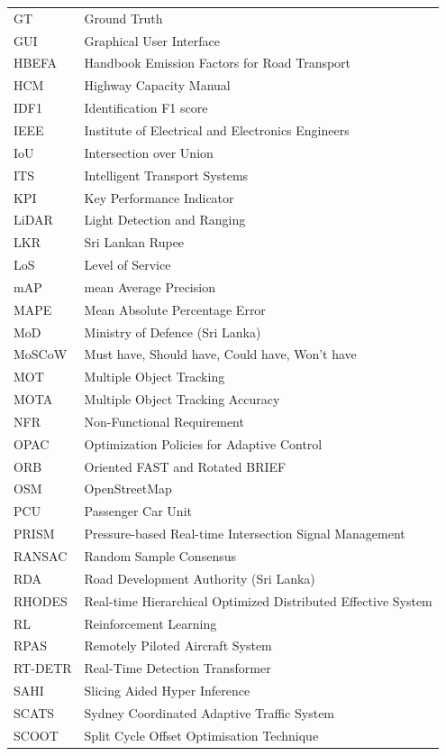 \begin{longtable}{@{}p{}p{}@{}}
GT & Ground Truth\\
GUI & Graphical User Interface\\
HBEFA & Handbook Emission Factors for Road Transport\\
HCM & Highway Capacity Manual\\
IDF1 & Identification F1 score\\
IEEE & Institute of Electrical and Electronics Engineers\\
IoU & Intersection over Union\\
ITS & Intelligent Transport Systems\\
KPI & Key Performance Indicator\\
LiDAR & Light Detection and Ranging\\
LKR & Sri Lankan Rupee\\
LoS & Level of Service\\
mAP & mean Average Precision\\
MAPE & Mean Absolute Percentage Error\\
MoD & Ministry of Defence (Sri Lanka)\\
MoSCoW & Must have, Should have, Could have, Won't have\\
MOT & Multiple Object Tracking\\
MOTA & Multiple Object Tracking Accuracy\\
NFR & Non-Functional Requirement\\
OPAC & Optimization Policies for Adaptive Control\\
ORB & Oriented FAST and Rotated BRIEF\\
OSM & OpenStreetMap\\
PCU & Passenger Car Unit\\
PRISM & Pressure-based Real-time Intersection Signal Management\\
RANSAC & Random Sample Consensus\\
RDA & Road Development Authority (Sri Lanka)\\
RHODES & Real-time Hierarchical Optimized Distributed Effective System\\
RL & Reinforcement Learning\\
RPAS & Remotely Piloted Aircraft System\\
RT-DETR & Real-Time Detection Transformer\\
SAHI & Slicing Aided Hyper Inference\\
SCATS & Sydney Coordinated Adaptive Traffic System\\
SCOOT & Split Cycle Offset Optimisation Technique\\

\end{longtable}
